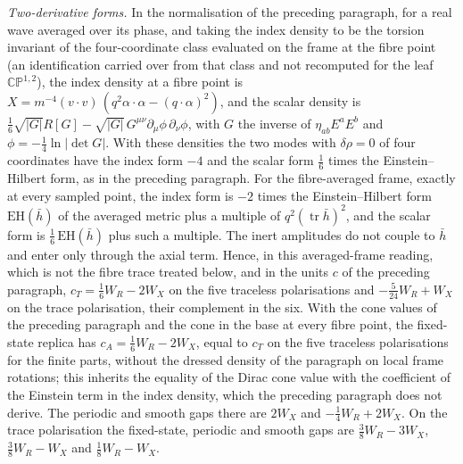 \emph{Two-derivative forms.} In the normalisation of the preceding paragraph, for a real wave averaged over its phase, and taking the index density to be the torsion invariant of the four-coordinate class evaluated on the frame at the fibre point (an identification carried over from that class and not recomputed for the leaf \(\mathbb{CP}^{1,2}\)), the index density at a fibre point is \(X=m^{-4}(v\cdot v)\,(q^2\alpha\cdot\alpha-(q\cdot\alpha)^2)\), and the scalar density is \(\tfrac16\sqrt{|G|}R[G]-\sqrt{|G|}\,G^{\mu\nu}\partial_\mu\phi\,\partial_\nu\phi\), with \(G\) the inverse of \(\eta_{ab}E^aE^b\) and \(\phi=-\tfrac14\ln|\det G|\). With these densities the two modes with \(\delta\rho=0\) of four coordinates have the index form \(-4\) and the scalar form \(\tfrac16\) times the Einstein--Hilbert form, as in the preceding paragraph. For the fibre-averaged frame, exactly at every sampled point, the index form is \(-2\) times the Einstein--Hilbert form \(\mathrm{EH}(\bar h)\) of the averaged metric plus a multiple of \(q^2(\operatorname{tr}\bar h)^2\), and the scalar form is \(\tfrac16\,\mathrm{EH}(\bar h)\) plus such a multiple. The inert amplitudes do not couple to \(\bar h\) and enter only through the axial term. Hence, in this averaged-frame reading, which is not the fibre trace treated below, and in the units \(c\) of the preceding paragraph, \(c_T=\tfrac16W_R-2W_X\) on the five traceless polarisations and \(-\tfrac5{24}W_R+W_X\) on the trace polarisation, their complement in the six. With the cone values of the preceding paragraph and the cone in the base at every fibre point, the fixed-state replica has \(c_A=\tfrac16W_R-2W_X\), equal to \(c_T\) on the five traceless polarisations for the finite parts, without the dressed density of the paragraph on local frame rotations; this inherits the equality of the Dirac cone value with the coefficient of the Einstein term in the index density, which the preceding paragraph does not derive. The periodic and smooth gaps there are \(2W_X\) and \(-\tfrac14W_R+2W_X\). On the trace polarisation the fixed-state, periodic and smooth gaps are \(\tfrac38W_R-3W_X\), \(\tfrac38W_R-W_X\) and \(\tfrac18W_R-W_X\).

